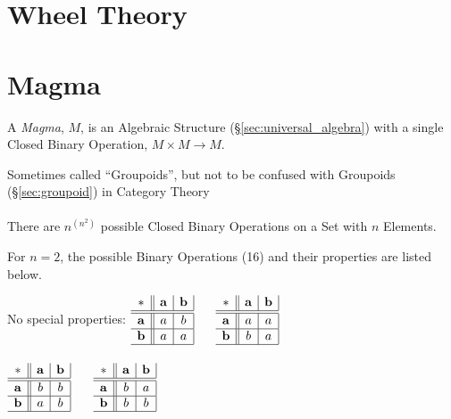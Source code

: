 \section{Wheel Theory}\label{sec:wheel_theory}




\section{Magma}\label{sec:magma}

A \emph{Magma}, $M$, is an Algebraic Structure (\S\ref{sec:universal_algebra})
with a single Closed Binary Operation, $M \times M \rightarrow M$.

\fist Sometimes called ``Groupoids'', but not to be confused with Groupoids
(\S\ref{sec:groupoid}) in Category Theory
\\ \\

There are $n^(n^2)$ possible Closed Binary Operations on a Set with $n$
Elements.

For $n=2$, the possible Binary Operations (16) and their properties are listed
below.

No special properties:
$\begin{array}{c||c|c|}
  * & \mathbf{a} & \mathbf{b} \\ \hline \hline
  \mathbf{a} & a & b \\ \hline
  \mathbf{b} & a & a \\ \hline
\end{array}$ $\quad$ $\begin{array}{c||c|c|}
  * & \mathbf{a} & \mathbf{b} \\ \hline \hline
  \mathbf{a} & a & a \\ \hline
  \mathbf{b} & b & a \\ \hline
\end{array}$ \\ \hfill \\

$\begin{array}{c||c|c|}
  * & \mathbf{a} & \mathbf{b} \\ \hline \hline
  \mathbf{a} & b & b \\ \hline
  \mathbf{b} & a & b \\ \hline
\end{array}$ $\quad$ $\begin{array}{c||c|c|}
  * & \mathbf{a} & \mathbf{b} \\ \hline \hline
  \mathbf{a} & b & a \\ \hline
  \mathbf{b} & b & b \\ \hline
\end{array}$ \\ \hfill \\

